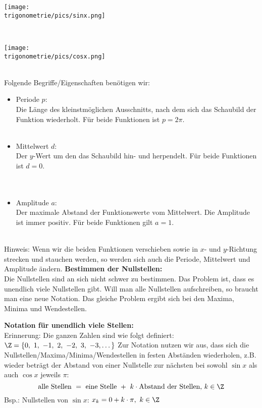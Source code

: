 \begin{minipage}{\textwidth}
	\texttt{[image: \\trigonometrie/pics/sinx.png]}\\
\end{minipage}\\
\begin{minipage}{\textwidth}
	\texttt{[image: \\trigonometrie/pics/cosx.png]}\\
\end{minipage}\\
Folgende Begriffe/Eigenschaften benötigen wir:
\begin{itemize}
	\item Periode \(p\):\\
	\textcolor{loes}{Die Länge des kleinstmöglichen Ausschnitts, nach dem sich das Schaubild der Funktion wiederholt. Für beide Funktionen ist \(p=2\pi\).}\\ \\
	\item Mittelwert \(d\):\\
	\textcolor{loes}{Der \(y\)-Wert um den das Schaubild hin- und herpendelt. Für beide Funktionen ist \(d=0\).}\\	\\ \\
	\item Amplitude \(a\):\\
	\textcolor{loes}{Der maximale Abstand der Funktionswerte vom Mittelwert. Die Amplitude ist immer positiv. Für beide Funktionen gilt \(a=1\).}\\	 \\
\end{itemize}
Hinweis: Wenn wir die beiden Funktionen verschieben sowie in \(x\)- und \(y\)-Richtung strecken und stauchen werden, so werden sich auch die Periode, Mittelwert und Amplitude ändern.
\newpage
\textbf{Bestimmen der Nullstellen:}\\
Die Nullstellen sind an sich nicht schwer zu bestimmen. Das Problem ist, dass es unendlich viele Nullstellen gibt. Will man alle Nullstellen aufschreiben, so braucht man eine neue Notation. Das gleiche Problem ergibt sich bei den Maxima, Minima und Wendestellen.
\begin{tcolorbox}
	\textbf{Notation für unendlich viele Stellen:}\\
	Erinnerung: Die ganzen Zahlen sind wie folgt definiert: \(\Z=\{0,\ 1,\ -1,\ 2,\ -2,\ 3,\ -3,\dots\}\)
	\textcolor{loestc}{Zur Notation nutzen wir aus, dass sich die Nullstellen/Maxima/Minima/Wendestellen in festen Abständen wiederholen, z.B. wieder beträgt der Abstand von einer Nullstelle zur nächsten bei sowohl \(\sin x\) als auch \(\cos x\)	jeweils \(\pi\):
		\[\text{alle Stellen }=\text{ eine Stelle }+\ k\cdot\text{Abstand der Stellen, }k\in\Z\]
		Bsp.: Nullstellen von \(\sin x\): \(x_k=0+k\cdot \pi,\ k\in\Z\)
	}
\end{tcolorbox}

